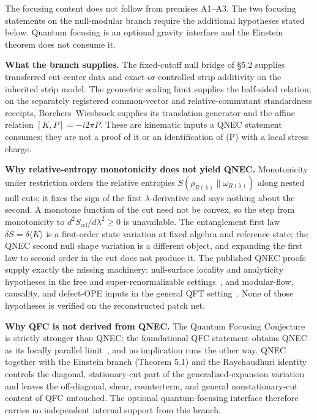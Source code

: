 The focusing content does not follow from premises A1--A3. The two focusing statements on the null-modular branch require the additional hypotheses stated below. Quantum focusing is an optional gravity interface and the Einstein theorem does not consume it.

\textbf{What the branch supplies.} The fixed-cutoff null bridge of \S{}5.2 supplies transferred cut-center data and exact-or-controlled strip additivity on the inherited strip model.  The geometric scaling limit supplies the half-sided relation; on the separately registered common-vector and relative-commutant standardness receipts, Borchers--Wiesbrock supplies its translation generator and the affine relation \([K,P]=-i2\pi P\). These are kinematic inputs a QNEC statement consumes; they are not a proof of it or an identification of (P) with a local stress charge.

\textbf{Why relative-entropy monotonicity does not yield QNEC.} Monotonicity under restriction orders the relative entropies \(S(\rho_{R(\lambda)}\|\omega_{R(\lambda)})\) along nested null cuts; it fixes the sign of the first \(\lambda\)-derivative and says nothing about the second. A monotone function of the cut need not be convex, so the step from monotonicity to \(d^2 S_{\mathrm{rel}}/d\lambda^2\ge0\) is unavailable. The entanglement first law \(\delta S=\delta\langle K\rangle\) is a first-order state variation at fixed algebra and reference state; the QNEC second null shape variation is a different object, and expanding the first law to second order in the cut does not produce it. The published QNEC proofs supply exactly the missing machinery: null-surface locality and analyticity hypotheses in the free and super-renormalizable settings~\cite{bousso16}, and modular-flow, causality, and defect-OPE inputs in the general QFT setting~\cite{balakrishnan19}. None of those hypotheses is verified on the reconstructed patch net.

\textbf{Why QFC is not derived from QNEC.} The Quantum Focusing Conjecture is strictly stronger than QNEC: the foundational QFC statement obtains QNEC as its locally parallel limit~\cite{bousso15qfc}, and no implication runs the other way. QNEC together with the Einstein branch (Theorem 5.1) and the Raychaudhuri identity controls the diagonal, stationary-cut part of the generalized-expansion variation and leaves the off-diagonal, shear, counterterm, and general nonstationary-cut content of QFC untouched. The optional quantum-focusing interface therefore carries no independent internal support from this branch.

